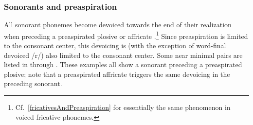 \subsubsection{Sonorants and preaspiration}\label{sonorantsAndPreaspiration}
All sonorant phonemes become devoiced towards the end of their realization when preceding a preaspirated plosive or affricate%
.\footnote{Cf.~\SEC\ref{fricativesAndPreaspiration} for essentially the same phenomenon in voiced fricative phonemes.} 
Since preaspiration is limited to the consonant center, this devoicing is (with the exception of word-final devoiced /r/) also limited to the consonant center. Some near minimal pairs are listed in  through . 
These examples all show a sonorant preceding a preaspirated plosive; note that a preaspirated affricate triggers the same devoicing in the preceding sonorant. 



